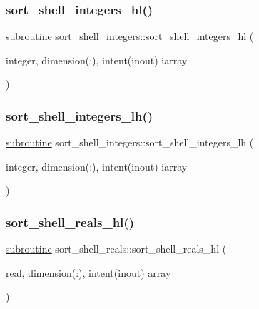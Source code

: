 \subsubsection{\texorpdfstring{sort\+\_\+shell\+\_\+integers\+\_\+hl()}{sort\_shell\_integers\_hl()}}
{\footnotesize\ttfamily \hyperlink{M__stopwatch_83_8txt_acfbcff50169d691ff02d4a123ed70482}{subroutine} sort\+\_\+shell\+\_\+integers\+::sort\+\_\+shell\+\_\+integers\+\_\+hl (\begin{DoxyParamCaption}\item[{integer, dimension(\+:), intent(inout)}]{iarray }\end{DoxyParamCaption})\hspace{0.3cm}{\ttfamily [private]}}

\mbox{\label{M__sort_8f90_a70ecc76a57b8e40ef2343a5e3eb6888e}} 
\subsubsection{\texorpdfstring{sort\+\_\+shell\+\_\+integers\+\_\+lh()}{sort\_shell\_integers\_lh()}}
{\footnotesize\ttfamily \hyperlink{M__stopwatch_83_8txt_acfbcff50169d691ff02d4a123ed70482}{subroutine} sort\+\_\+shell\+\_\+integers\+::sort\+\_\+shell\+\_\+integers\+\_\+lh (\begin{DoxyParamCaption}\item[{integer, dimension(\+:), intent(inout)}]{iarray }\end{DoxyParamCaption})\hspace{0.3cm}{\ttfamily [private]}}

\mbox{\label{M__sort_8f90_a63fb4486f21d271616dd3d9ae7d1d90f}} 
\subsubsection{\texorpdfstring{sort\+\_\+shell\+\_\+reals\+\_\+hl()}{sort\_shell\_reals\_hl()}}
{\footnotesize\ttfamily \hyperlink{M__stopwatch_83_8txt_acfbcff50169d691ff02d4a123ed70482}{subroutine} sort\+\_\+shell\+\_\+reals\+::sort\+\_\+shell\+\_\+reals\+\_\+hl (\begin{DoxyParamCaption}\item[{\hyperlink{read__watch_83_8txt_abdb62bde002f38ef75f810d3a905a823}{real}, dimension(\+:), intent(inout)}]{array }\end{DoxyParamCaption})\hspace{0.3cm}{\ttfamily [private]}}

